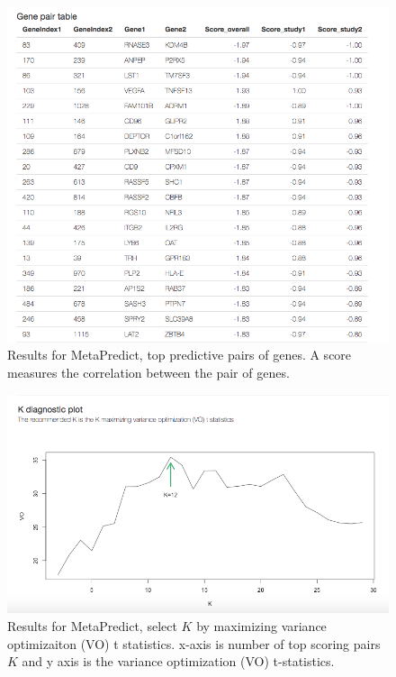 \begin{figure}[H]
\begin{center}
\includegraphics[scale=0.5]{./figure/MetaPredict/MetaPredictresult1.png}
\caption{Results for MetaPredict, top predictive pairs of genes.
A score measures the correlation between the pair of genes.
}
\label{fig:MetaPredictresult1}
\end{center}
\end{figure}


\begin{figure}[H]
\begin{center}
\includegraphics[scale=0.5]{./figure/MetaPredict/MetaPredictresult2.png}
\caption{Results for MetaPredict, select $K$ by maximizing variance optimizaiton (VO) t statistics.
x-axis is number of top scoring pairs $K$ and y axis is the variance optimization (VO) t-statistics.
}
\label{fig:MetaPredictresult2}
\end{center}
\end{figure}


